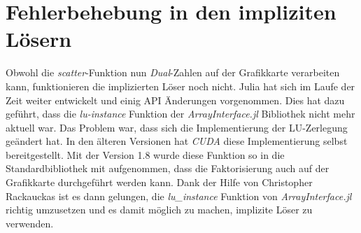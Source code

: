 
\section{ Fehlerbehebung in den impliziten Lösern } \label{sec:fehler_in_implizit_solver}

Obwohl die \textit{scatter}-Funktion nun \textit{Dual}-Zahlen auf der Grafikkarte verarbeiten kann, 
funktionieren die implizierten Löser noch nicht. 
Julia hat sich im Laufe der Zeit weiter entwickelt und einig API Änderungen vorgenommen.
Dies hat dazu geführt, dass die \textit{lu-instance} Funktion
der \textit{ArrayInterface.jl} Bibliothek \cite{arrayinterface} nicht mehr aktuell
war.
Das Problem war, dass sich die Implementierung der LU-Zerlegung geändert hat.
In den älteren Versionen hat \textit{CUDA} \cite{besard2018juliagpu} diese Implementierung selbst bereitgestellt.
Mit der Version 1.8 wurde diese Funktion so in die Standardbibliothek mit aufgenommen, 
dass die Faktorisierung auch auf der Grafikkarte durchgeführt werden kann.
Dank der Hilfe von Christopher Rackauckas \cite{chris} ist es 
dann gelungen, die \textit{lu\_instance} Funktion 
von \textit{ArrayInterface.jl} richtig umzusetzen \cite{firstIssue,finalIssue,testForIssue,rosenbrock}
und es damit möglich zu machen, implizite Löser zu verwenden.